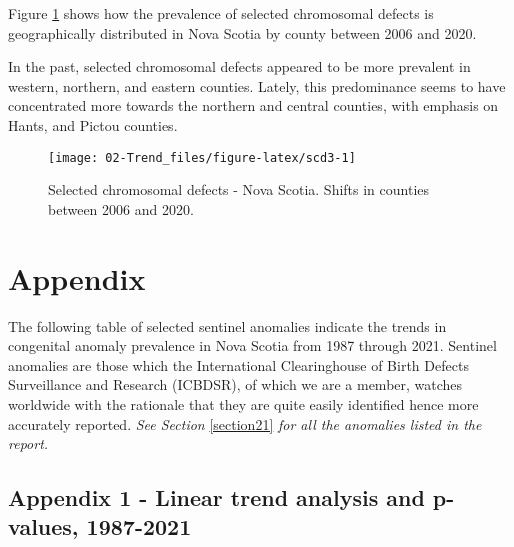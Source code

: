 \documentclass[
]{krantz}
\begin{document}
Figure \ref{fig:scd3} shows how the prevalence of selected chromosomal defects is geographically distributed in Nova Scotia by county between 2006 and 2020.

In the past, selected chromosomal defects appeared to be more prevalent in western, northern, and eastern counties. Lately, this predominance seems to have concentrated more towards the northern and central counties, with emphasis on Hants, and Pictou counties.

\begin{figure}[h]

{\centering \texttt{[image: 02-Trend\_files/figure-latex/scd3-1]} 

}

\caption{Selected chromosomal defects - Nova Scotia. Shifts in counties between 2006 and 2020.}\label{fig:scd3}
\end{figure}

\hypertarget{appendix}{%
\chapter*{Appendix}\label{appendix}}


The following table of selected sentinel anomalies indicate the trends in congenital anomaly prevalence in Nova Scotia from 1987 through 2021. Sentinel anomalies are those which the International Clearinghouse of Birth Defects Surveillance and Research (ICBDSR), of which we are a member, watches worldwide with the rationale that they are quite easily identified hence more accurately reported. \emph{See Section} \ref{section21} \emph{for all the anomalies listed in the report.}

\hypertarget{section-a1}{%
\section{Appendix 1 - Linear trend analysis and p-values, 1987-2021}\label{section-a1}}

\begingroup\fontsize{7}{9}\selectfont
\end{document}
